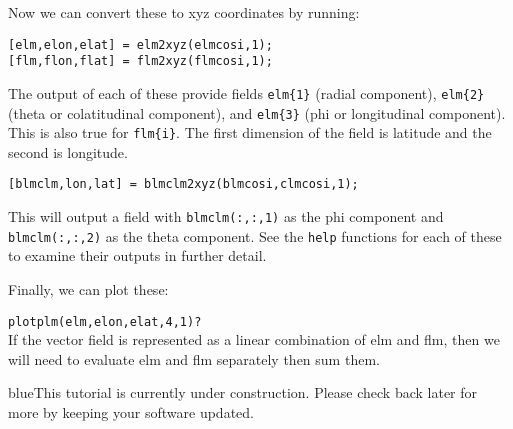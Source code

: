 \documentclass[11pt]{article}
\newcommand{\TAG}{\begin{color}{blue}This tutorial is currently under construction. Please check back later for more by keeping your software updated.\end{color}}
\begin{document}
Now we can convert these to xyz coordinates by running:

\verb|[elm,elon,elat] = elm2xyz(elmcosi,1);|\\
\verb|[flm,flon,flat] = flm2xyz(flmcosi,1);|

The output of each of these provide fields \verb|elm{1}| (radial component), \verb|elm{2}| (theta or colatitudinal component), and \verb|elm{3}| (phi or longitudinal component).  This is also true for \verb|flm{i}|.  The first dimension of the field is latitude and the second is longitude.

\verb|[blmclm,lon,lat] = blmclm2xyz(blmcosi,clmcosi,1);|

This will output a field with \verb|blmclm(:,:,1)| as the phi component and \verb|blmclm(:,:,2)| as the theta component.  See the \verb|help| functions for each of these to examine their outputs in further detail.

Finally, we can plot these:

\verb|plotplm(elm,elon,elat,4,1)?|\\


If the vector field is represented as a linear combination of elm and flm, then we will need to evaluate elm and flm separately then sum them.



\TAG
\end{document}
